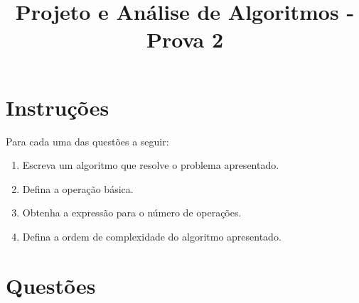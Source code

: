 \documentclass[12pt]{article}
\title{\vspace{-1.5cm} Projeto e Análise de Algoritmos - Prova 2}
\author{}
\date{}
\begin{document}
\maketitle

\vspace{-2cm} 
\section*{Instruções}
Para cada uma das questões a seguir:
\begin{enumerate}[noitemsep] 
    \item Escreva um algoritmo que resolve o problema apresentado.
    \item Defina a operação básica.
    \item Obtenha a expressão para o número de operações.
    \item Defina a ordem de complexidade do algoritmo apresentado.  
\end{enumerate}

\section*{Questões}
\end{document}
